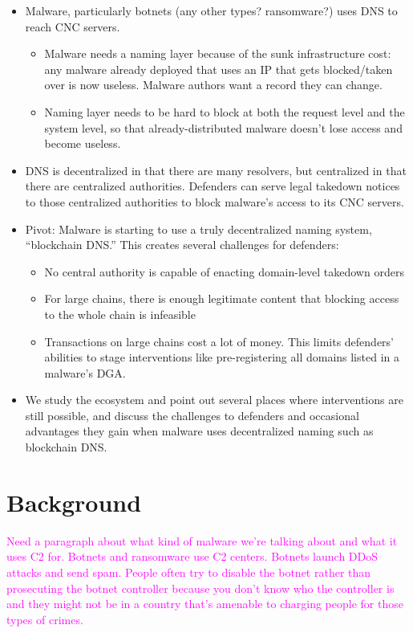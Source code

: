\documentclass[10pt,sigconf,letterpaper]{acmart}
\newcommand{\randall}{\ding{110}\ding{43}\textcolor{magenta}}
\newcommand{\randall}{}
\begin{document}
\begin{itemize}
	\item Malware, particularly botnets (any other types? ransomware?) uses DNS to reach CNC 
	servers. 
	\begin{itemize}
		\item Malware needs a naming layer because of the 
		sunk infrastructure cost: 
		any malware already deployed that uses an IP that gets blocked/taken 
		over is now useless. Malware authors want a record they can change.
		\item Naming layer needs to be hard to block at both 
		the request level and the system level, so that 
		already-distributed malware doesn't lose access and 
		become useless. 
	\end{itemize}
	\item DNS is decentralized in that there are many resolvers, but 
	centralized in that there are centralized authorities. Defenders can serve 
	legal takedown notices to those centralized authorities to block malware's 
	access to its CNC servers.
	\item Pivot: Malware is starting to use a truly decentralized naming 
	system, ``blockchain DNS.'' This creates several challenges for defenders:
	\begin{itemize}
		\item No central authority is capable of enacting domain-level takedown 
		orders
		\item For large chains, there is enough legitimate content that 
		blocking access to the whole chain is infeasible
		\item Transactions on large chains cost a lot of money. This limits 
		defenders' abilities to stage interventions like pre-registering all 
		domains listed in a malware's DGA.
	\end{itemize}
	\item We study the ecosystem and point out several places where 
	interventions are still possible, and discuss the challenges to defenders 
	and occasional advantages they gain when malware uses decentralized naming 
	such as blockchain DNS.
\end{itemize}

\section{Background}

\randall{Need a paragraph about what kind of malware we're talking about and what it uses C2 for.
Botnets and ransomware use C2 centers. Botnets launch DDoS attacks and send spam. People often try 
to disable the botnet rather than prosecuting the botnet controller because you don't know who the 
controller is and they might not be in a country that's amenable to charging people for those types 
of crimes.}
\end{document}
